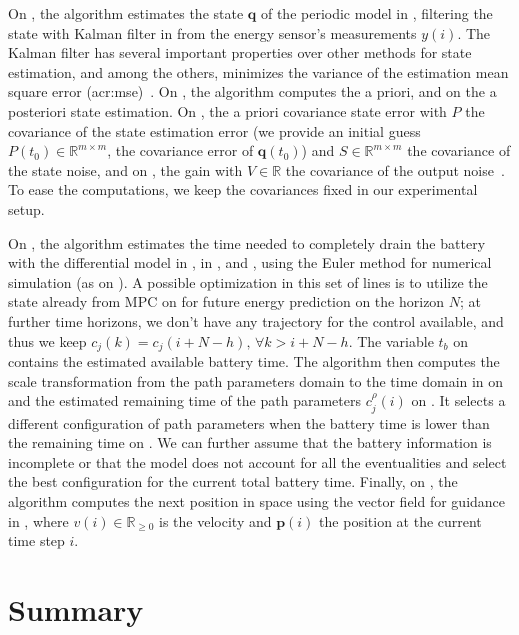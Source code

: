 On , the algorithm estimates the state $\mathbf{q}$ of the periodic model in , filtering the state with Kalman filter in  from the energy sensor's measurements $y(i)$. The Kalman filter has several important properties over other methods for state estimation, and among the others, minimizes the variance of the estimation mean square error (\Gls{acr:mse})~\citep{kalman1960new,simon2006optimal,jwo2007practical}. On , the algorithm computes the a priori, and on  the a posteriori state estimation. On , the a priori covariance state error with $P$ the covariance of the state estimation error (we provide an initial guess $P(t_0)\in\mathbb{R}^{m\times m}$, the covariance error of $\mathbf{q}(t_0)$) and $S\in\mathbb{R}^{m\times m}$ the covariance of the state noise, and on , the gain with $V\in\mathbb{R}$ the covariance of the output noise~\citep{simon2006optimal}. To ease the computations, we keep the covariances fixed in our experimental setup.

On , the algorithm estimates the time needed to completely drain the battery with the differential model in , in , and , using the Euler method for numerical simulation (as on ). A possible optimization in this set of lines is to utilize the state already from MPC on  for future energy prediction on the horizon $N$; at further time horizons, we don't have any trajectory for the control available, and thus we keep $c_j(k)=c_j(i+N-h),\,\forall k>i+N-h$. The variable $t_b$ on  contains the estimated available battery time. The algorithm then computes the scale transformation from the path parameters domain to the time domain in  on  and the estimated remaining time of the path parameters $c_j^\rho(i)$ on . It selects a different configuration of path parameters when the battery time is lower than the remaining time on . We can further assume that the battery information is incomplete or that the model does not account for all the eventualities and select the best configuration for the current total battery time. Finally, on , the algorithm computes the next position in space using the vector field for guidance in , where $v(i)\in\mathbb{R}_{\geq 0}$ is the velocity and $\mathbf{p}(i)$ the position at the current time step $i$. 


\section{\color{red}Summary}

